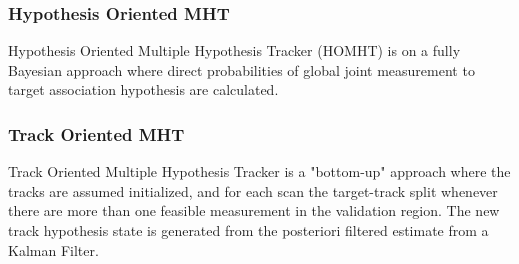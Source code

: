 \subsubsection{Hypothesis Oriented MHT}
Hypothesis Oriented Multiple Hypothesis Tracker (HOMHT) is on a fully Bayesian approach where direct probabilities of global joint measurement to target association hypothesis are calculated.

\subsubsection{Track Oriented MHT}
Track Oriented Multiple Hypothesis Tracker is a "bottom-up" approach where the tracks are assumed initialized, and for each scan the target-track split whenever there are more than one feasible measurement in the validation region. The new track hypothesis state is generated from the posteriori filtered estimate from a Kalman Filter. 


